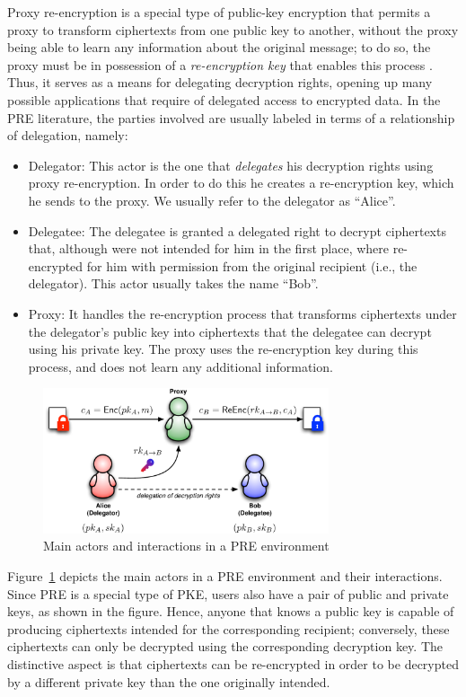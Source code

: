 \documentclass{amsart}
\begin{document}
Proxy re-encryption is a special type of public-key encryption that permits a proxy to transform ciphertexts from one public key to another, without the proxy being able to learn any information about the original message; to do so, the proxy must be in possession of a \emph{re-encryption key} that enables this process \cite{nunez2017proxy}. Thus, it serves as a means for delegating decryption rights, opening up many possible applications that require of delegated access to encrypted data. In the PRE literature, the parties involved are usually labeled in terms of a relationship of delegation, namely: %
\begin{itemize}
\item Delegator: This actor is the one that \emph{delegates} his decryption rights using proxy re-encryption. In order to do this he creates a re-encryption key, which he sends to the proxy. We usually refer to the delegator as ``Alice''.
\item Delegatee: The delegatee is granted a delegated right to decrypt ciphertexts that, although were not intended for him in the first place, where re-encrypted for him with permission from the original recipient (i.e., the delegator). This actor usually takes the name ``Bob''.
\item Proxy: It handles the re-encryption process that transforms ciphertexts under the delegator's public key into ciphertexts that the delegatee can decrypt using his private key. The proxy uses the re-encryption key during this process, and does not learn any additional information. 
\end{itemize}

\begin{figure}%
\centering
\includegraphics[width=0.75\textwidth]{figures/pre.pdf}
\caption{Main actors and interactions in a PRE environment}
\label{fig:pre-actores}
\end{figure}

Figure~\ref{fig:pre-actores} depicts the main actors in a PRE environment and their interactions. Since PRE is a special type of PKE, users also have a pair of public and private keys, as shown in the figure. Hence, anyone that knows a public key is capable of producing ciphertexts intended for the corresponding recipient; conversely, these ciphertexts can only be decrypted using the corresponding decryption key. 
The distinctive aspect is that ciphertexts can be re-encrypted in order to be decrypted by a different private key than the one originally intended. 
\end{document}
